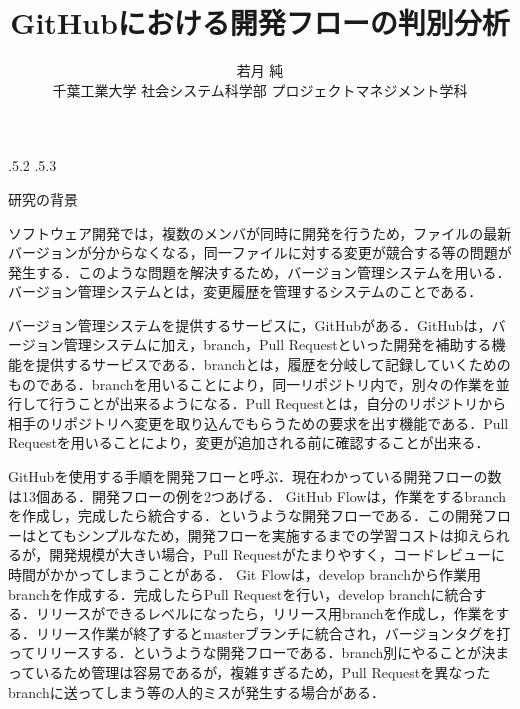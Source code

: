 \documentclass[uplatex,twocolumn]{jsarticle}
\title{\vspace{-14mm}GitHubにおける開発フローの判別分析 \footnotemark[0]}
\author{若月 純 \footnotemark[1] \\ 千葉工業大学 社会システム科学部 プロジェクトマネジメント学科\footnotemark[2]}
\date{}%
\makeatletter
\renewcommand{\section}{%
    \if@slide\clearpage\fi
    \@startsection{section}{1}{\z@}%
    {\Cvs \@plus.5\Cdp \@minus.2\Cdp}%
    {.5\Cvs \@plus.3\Cdp}%
    {\normalfont\raggedright}}
\makeatother
\begin{document}
\lhead{}
\rhead{}
\lfoot{}
\cfoot{}


\twocolumn[
	\maketitle\thispagestyle{fancy}
]
\begingroup
\def\thefootnote{\fnsymbol{footnote}}
\endgroup

\section{研究の背景}

ソフトウェア開発では，複数のメンバが同時に開発を行うため，ファイルの最新バージョンが分からなくなる，同一ファイルに対する変更が競合する等の問題が発生する．このような問題を解決するため，バージョン管理システムを用いる．バージョン管理システムとは，変更履歴を管理するシステムのことである\cite{ikeda2014}．

バージョン管理システムを提供するサービスに，GitHubがある．GitHubは，バージョン管理システムに加え，branch，Pull Requestといった開発を補助する機能を提供するサービスである．branchとは，履歴を分岐して記録していくためのものである．branchを用いることにより，同一リポジトリ内で，別々の作業を並行して行うことが出来るようになる．Pull Requestとは，自分のリポジトリから相手のリポジトリへ変更を取り込んでもらうための要求を出す機能である．Pull Requestを用いることにより，変更が追加される前に確認することが出来る．

GitHubを使用する手順を開発フローと呼ぶ．現在わかっている開発フローの数は13個ある．開発フローの例を2つあげる．
GitHub Flowは，作業をするbranchを作成し，完成したら統合する．というような開発フローである．この開発フローはとてもシンプルなため，開発フローを実施するまでの学習コストは抑えられるが，開発規模が大きい場合，Pull Requestがたまりやすく，コードレビューに時間がかかってしまうことがある．
Git Flowは，develop branchから作業用branchを作成する．完成したらPull Requestを行い，develop branchに統合する．リリースができるレベルになったら，リリース用branchを作成し，作業をする．リリース作業が終了するとmasterブランチに統合され，バージョンタグを打ってリリースする．というような開発フローである．branch別にやることが決まっているため管理は容易であるが，複雑すぎるため，Pull Requestを異なったbranchに送ってしまう等の人的ミスが発生する場合がある\cite{otsuka2014}．
\end{document}

